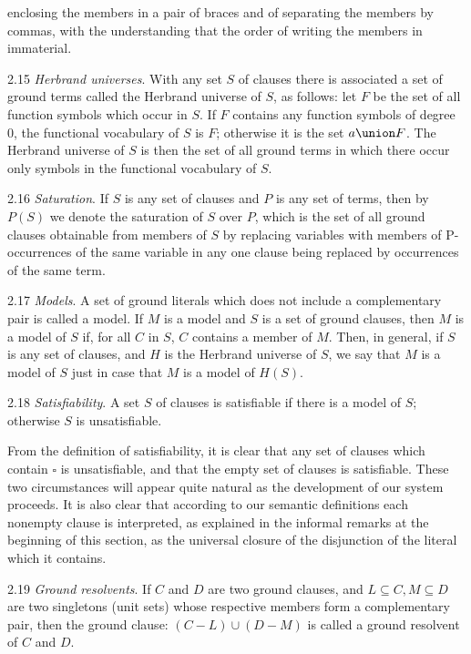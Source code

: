 \documentclass[8pt]{extarticle}
\begin{document}
\newpage
\noindent enclosing the members in a pair of braces and of separating the members by commas, with the understanding that the order of writing the members in immaterial.

2.15 \emph{Herbrand universes}. With any set $S$ of clauses there is associated a set of ground terms called the Herbrand universe of $S$, as follows: let $F$ be the set of all function symbols which occur in $S$. If $F$ contains any function symbols of degree 0, the functional vocabulary of $S$ is $F$; otherwise it is the set ${a}\union F$. The Herbrand universe of $S$ is then the set of all ground terms in which there occur only symbols in the functional vocabulary of $S$.

2.16 \emph{Saturation}. If $S$ is any set of clauses and $P$ is any set of terms, then by $P(S)$ we denote the saturation of $S$ over $P$, which is the set of all ground clauses obtainable from members of $S$ by replacing variables with members of P-occurrences of the same variable in any one clause being replaced by occurrences of the same term.

2.17 \emph{Models}. A set of ground literals which does not include a complementary pair is called a model. If $M$ is a model and $S$ is a set of ground clauses, then $M$ is a model of $S$ if, for all $C$ in $S$, $C$ contains a member of $M$. Then, in general, if $S$ is any set of clauses, and $H$ is the Herbrand universe of $S$, we say that $M$ is a model of $S$ just in case that $M$ is a model of $H(S)$.

2.18 \emph{Satisfiability}. A set $S$ of clauses is satisfiable if there is a model of $S$; otherwise $S$ is unsatisfiable.

From the definition of satisfiability, it is clear that any set of clauses which contain $\square$ is unsatisfiable, and that the empty set of clauses is satisfiable. These two circumstances will appear quite natural as the development of our system proceeds. It is also clear that according to our semantic definitions each nonempty clause is interpreted, as explained in the informal remarks at the beginning of this section, as the universal closure of the disjunction of the literal which it contains.

2.19 \emph{Ground resolvents}. If $C$ and $D$ are two ground clauses, and $L\subseteq C,M\subseteq D$ are two singletons (unit sets) whose respective members form a complementary pair, then the ground clause: $(C - L)\cup (D - M)$ is called a ground resolvent of $C$ and $D$.
\end{document}
